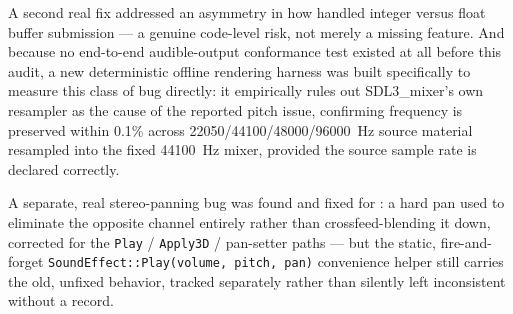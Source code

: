 A second real fix addressed an asymmetry in how 
handled integer versus float buffer submission --- a genuine code-level risk, not merely a
missing feature. And because no end-to-end audible-output conformance test existed at all
before this audit, a new deterministic offline rendering harness was built specifically to
measure this class of bug directly: it empirically rules out SDL3\_mixer's own resampler as
the cause of the reported pitch issue, confirming frequency is preserved within 0.1\% across
22050/44100/48000/96000~Hz source material resampled into the fixed 44100~Hz mixer, provided
the source sample rate is declared correctly.

A separate, real stereo-panning bug was found and fixed for :
a hard pan used to eliminate the opposite channel entirely rather than crossfeed-blending it
down, corrected for the \texttt{Play} / \texttt{Apply3D} / pan-setter paths --- but the static,
fire-and-forget \texttt{SoundEffect::Play(volume, pitch, pan)} convenience helper still
carries the old, unfixed behavior, tracked separately rather than silently left inconsistent
without a record.

